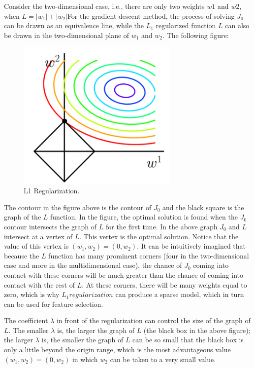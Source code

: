 Consider the two-dimensional case, i.e., there are only two weights $w1$ and $w2$, when $L=\left|w_{1}\right|+\left|w_{2}\right|$For the gradient descent method, the process of solving $J_{0}$ can be drawn as an equivalence line, while the $L_{1}$ regularized function $L$ can also be drawn in the two-dimensional plane of $w_{1}$ and $w_{2}$. The following figure:
\begin{figure}[!htbp]
	\centering
	\includegraphics[width = 0.7\textwidth]{figures_ning/l1.png}
	\caption[The architecture of Faster R-CNN]
	{ L1 Regularization.}
	\label{fig:l1}
\end{figure}

The contour in the figure above is the contour of $J_{0}$ and the black square is the graph of the $L$ function. In the figure, the optimal solution is found when the $J_{0}$ contour intersects the graph of $L$ for the first time. In the above graph $J_{0}$ and $L$ intersect at a vertex of $L$. This vertex is the optimal solution. Notice that the value of this vertex is $\left(w_{1}, w_{2}\right)=\left(0, w_{2}\right)$. It can be intuitively imagined that because the $L$ function has many prominent corners (four in the two-dimensional case and more in the multidimensional case), the chance of $J_{0}$ coming into contact with these corners will be much greater than the chance of coming into contact with the rest of $L$. At these corners, there will be many weights equal to zero, which is why $L_{1} regularization$ can produce a sparse model, which in turn can be used for feature selection.

The coefficient $\lambda$ in front of the regularization can control the size of the graph of $L$. The smaller $\lambda$ is, the larger the graph of $L$ (the black box in the above figure); the larger $\lambda$ is, the smaller the graph of $L$ can be so small that the black box is only a little beyond the origin range, which is the most advantageous value  $\left(w_{1}, w_{2}\right)=\left(0, w_{2}\right)$ in which $w_{2}$ can be taken to a very small value.


